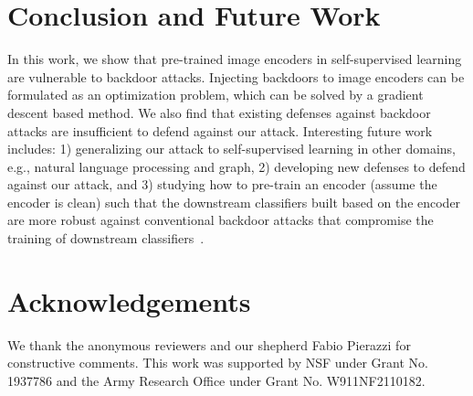 \section{Conclusion and Future Work}
In this work, we show that pre-trained image encoders in 
self-supervised learning are vulnerable to backdoor attacks. 
Injecting  backdoors to image encoders can be formulated as an optimization problem, which can be solved by a gradient descent based method. 
We also find that existing defenses against backdoor attacks are insufficient to defend against our attack. 
Interesting future work includes: 1) generalizing our attack to self-supervised learning in other domains, e.g., natural language processing and graph, 2) developing new defenses to defend against our attack, and 3) studying how to pre-train an encoder (assume the encoder is clean) such that the downstream classifiers built based on the encoder are more robust against conventional backdoor attacks that compromise the training of downstream classifiers~\cite{gu2017badnets,chen2017targeted,liutrojaning2018}. 


\section*{Acknowledgements}
We thank the anonymous reviewers and our shepherd Fabio Pierazzi for constructive comments. This work was supported by  NSF under Grant No. 1937786 and
the Army Research Office under Grant No. W911NF2110182. 
